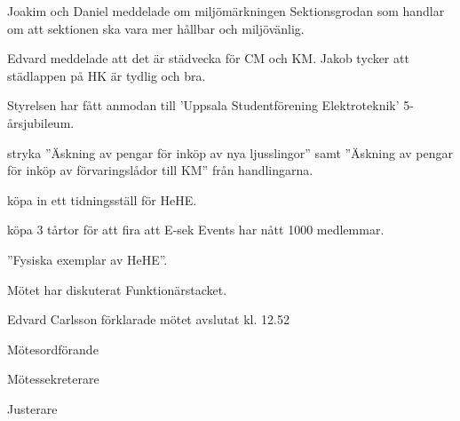 \documentclass[10pt]{article}
\def\mo{Edvard Carlsson}
\def\ms{Mattias Lundström}
\def\ji{Theo Nyman}
\begin{document}
\begin{paragrafer}

Joakim och Daniel meddelade om miljömärkningen Sektionsgrodan som handlar om att sektionen ska vara mer hållbar och miljövänlig. 

Edvard meddelade att det är städvecka för CM och KM. Jakob tycker att städlappen på HK är tydlig och bra. 


Styrelsen har fått anmodan till 'Uppsala Studentförening Elektroteknik' 5-årsjubileum.


\Mba stryka ''Äskning av pengar för inköp av nya ljusslingor'' samt ''Äskning av pengar för inköp av förvaringslådor till KM'' från handlingarna. 

\Mba köpa in ett tidningsställ för HeHE. 

\Mba köpa 3 tårtor för att fira att E-sek Events har nått 1000 medlemmar. 

\Fbs ''Fysiska exemplar av HeHE''.

Mötet har diskuterat Funktionärstacket. 

{\mo} förklarade mötet avslutat kl. 12.52
\end{paragrafer}

\hidesignfoot
\begin{signatures}{3}
\signature{\mo}{Mötesordförande}
\signature{\ms}{Mötessekreterare}
\signature{\ji}{Justerare}
\end{signatures}
\end{document}
